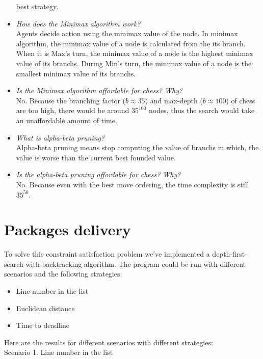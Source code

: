 \documentclass[a4paper, 12pt]{article}
\begin{document}
\begin{itemize}
			best strategy.
		\item \emph{How does the Minimax algorithm work?}\\		      
			Agents decide action using the minimax value of the node. In minimax algorithm, the minimax value of a node
			is calculated from the its branch. When it is Max's turn, the minimax value of a node is the highest minimax 
			value of its branchs. During Min's turn, the minimax value of a node is the smallest minimax value of its branchs.
		\item \emph{Is the Minimax algorithm affordable for chess? Why?}\\
			No. Because the branching factor ($b \approx 35$) and max-depth ($b \approx 100$) of chess are too high, 
			there would be around $35^{100}$ nodes, thus the search would take an unaffordable amount of time.
		\item \emph{What is alpha-beta pruning?}\\
			Alpha-beta pruning means stop computing the value of branchs in which, the value is worse
			than the current best founded value.
		\item \emph{Is the alpha-beta pruning affordable for chess? Why?}\\
			No. Because even with the best move ordering, the time complexity is still $35^{50}$.
    \end{itemize}
    
\section{Packages delivery}

To solve this constraint satisfaction problem we've implemented a depth-first-search with backtracking algorithm. The program could be run with different scenarios and the following strategies:
\begin{itemize}
\item  Line number in the list
\item Euclidean distance
\item Time to deadline
\end{itemize}

Here are the results for different scenarios with different strategies:\\

Scenario 1. Line number in the list
\end{document}
